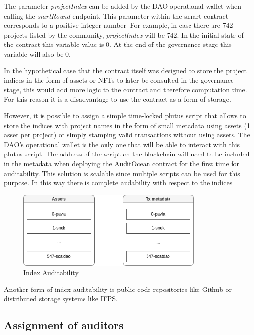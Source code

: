 \documentclass[9pt]{article}
\begin{document}
The parameter \emph{ projectIndex } can be added by the DAO operational wallet when calling the \emph{startRound} endpoint. This parameter within the smart contract corresponds to a positive integer number. For example, in case there are 742 projects listed by the community, \emph{ projectIndex } will be 742. In the initial state of the contract this variable value is 0. At the end of the governance stage this variable will also be 0.

In the hypothetical case that the contract itself was designed to store the project indices in the form of assets or NFTs to later be consulted in the governance stage, this would add more logic to the contract and therefore computation time. For this reason it is a disadvantage to use the contract as a form of storage.

However, it is possible to assign a simple time-locked plutus script that allows to store the indices with project names in the form of small metadata using assets (1 asset per project) or simply stamping valid transactions without using assets. The DAO's operational wallet is the only one that will be able to interact with this plutus script. The address of the script on the blockchain will need to be included in the metadata when deploying the AuditOcean contract for the first time for auditability. This solution is scalable since multiple scripts can be used for this purpose. In this way there is complete audability with respect to the indices.


\begin{figure}[ht]
  \centering
  \includegraphics[width=0.822\textwidth]{indices.png}
  \caption{Index Auditability
  }
  \label{fig:mi_imagen}
\end{figure}

Another form of index auditability is public code repositories like Github or distributed storage systems like IFPS.
\subsection { Assignment of auditors }
   
\end{document}
